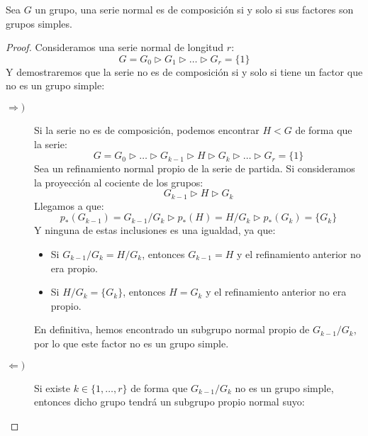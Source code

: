 \begin{prop}
    Sea $G$ un grupo, una serie normal es de composición si y solo si sus factores son grupos simples.
    \begin{proof}
        Consideramos una serie normal de longitud $r$:
        \begin{equation*}
            G = G_0 \rhd G_1 \rhd \ldots \rhd G_r = \{1\}
        \end{equation*}
        Y demostraremos que la serie no es de composición si y solo si tiene un factor que no es un grupo simple:
        \begin{description}
            \item [$\Longrightarrow)$] Si la serie no es de composición, podemos encontrar $H<G$ de forma que la serie:
                \begin{equation*}
                    G = G_0 \rhd \ldots \rhd G_{k-1} \rhd H \rhd G_k \rhd \ldots \rhd G_r = \{1\}
                \end{equation*}
                Sea un refinamiento normal propio de la serie de partida. Si consideramos la proyección al cociente de los grupos:
                \begin{equation*}
                    G_{k-1} \rhd H \rhd G_k
                \end{equation*}
                Llegamos a que:
                \begin{equation*}
                    p_\ast(G_{k-1}) = G_{k-1}/G_k \rhd p_\ast(H) = H/G_k \rhd p_\ast(G_k) = \{G_k\}
                \end{equation*}
                Y ninguna de estas inclusiones es una igualdad, ya que:
                \begin{itemize}
                    \item Si $G_{k-1}/G_k = H/G_k$, entonces $G_{k-1} = H$ y el refinamiento anterior no era propio.
                    \item Si $H/G_k = \{G_k\}$, entonces $H = G_k$ y el refinamiento anterior no era propio.
                \end{itemize}
                En definitiva, hemos encontrado un subgrupo normal propio de $G_{k-1}/G_k$, por lo que este factor no es un grupo simple.
            \item [$\Longleftarrow)$] Si existe $k\in \{1,\ldots,r\}$ de forma que $G_{k-1}/G_k$ no es un grupo simple, entonces dicho grupo tendrá un subgrupo propio normal suyo:
                \begin{equation*}

\end{equation*}
\end{description}
\end{proof}
\end{prop}
